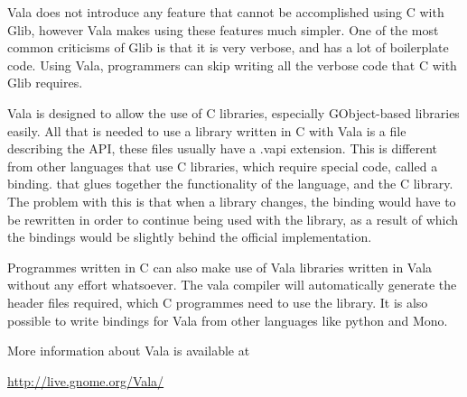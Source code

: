 Vala does not introduce any feature that cannot be accomplished using C with Glib, however Vala makes using these features much simpler. One of the most common criticisms of Glib is that it is very verbose, and has a lot of boilerplate code. Using Vala, programmers can skip writing all the verbose  code that C with Glib requires.

Vala is designed to allow the use of C libraries, especially GObject-based libraries easily. All that is needed to use a library written in C with Vala is a file describing the API, these files usually have a .vapi extension. This is different from other languages that use C libraries, which require special code, called a binding. that glues together the functionality of the language, and the C library. The problem with this is that when a library changes, the binding would have to be rewritten in order to continue being used with the library, as a result of which the bindings would be slightly behind the official implementation.

Programmes written in C can also make use of Vala libraries written in Vala without any effort whatsoever. The vala compiler will automatically generate the header files required, which C programmes need to use the library. It is also possible to write bindings for Vala from other languages like python and Mono.

More information about Vala is available at

\hspace{0.25in}\url{http://live.gnome.org/Vala/}
